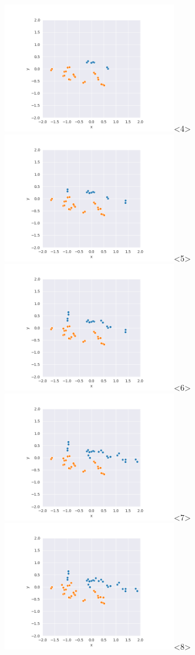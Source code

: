 \begin{frame}
  \includegraphics[width=3in]{../png/single_stretch/single_stretch_16.png}<4>
  \includegraphics[width=3in]{../png/single_stretch/single_stretch_21.png}<5>
  \includegraphics[width=3in]{../png/single_stretch/single_stretch_26.png}<6>
  \includegraphics[width=3in]{../png/single_stretch/single_stretch_31.png}<7>
  \includegraphics[width=3in]{../png/single_stretch/single_stretch_36.png}<8>

\end{frame}
